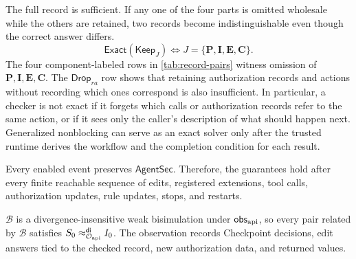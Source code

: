 \begin{theorem}
\label{thm:necessary-state}
The full record is sufficient.
If any one of the four parts is omitted wholesale while the others are retained, two records become indistinguishable even though the correct answer differs.
\[
\mathsf{Exact}(\mathsf{Keep}_J)\Longleftrightarrow
J=\{\mathbf P,\mathbf I,\mathbf E,\mathbf C\}.
\]
The four component-labeled rows in \cref{tab:record-pairs} witness omission of \(\mathbf P,\mathbf I,\mathbf E,\mathbf C\).
The \(\mathsf{Drop}_{ra}\) row shows that retaining authorization records and actions without recording which ones correspond is also insufficient.
In particular, a checker is not exact if it forgets which calls or authorization records refer to the same action, or if it sees only the caller's description of what should happen next.
Generalized nonblocking can serve as an exact solver only after the trusted runtime derives the workflow and the completion condition for each result.
\end{theorem}

\begin{theorem}
\label{thm:repeated-use}
Every enabled event preserves \(\mathsf{AgentSec}\).
Therefore, the guarantees hold after every finite reachable sequence of edits, registered extensions, tool calls, authorization updates, rule updates, stops, and restarts.
\end{theorem}

\begin{theorem}
\label{thm:runtime-correctness}
\(\mathcal B\) is a divergence-insensitive weak bisimulation under \(\mathsf{obs}_{\rm api}\), so every pair related by \(\mathcal B\) satisfies \(S_0\approx_{\mathcal O_{\rm api}}^{\mathsf{di}}I_0\).
The observation records Checkpoint decisions, edit answers tied to the checked record, new authorization data, and returned values.
\end{theorem}

